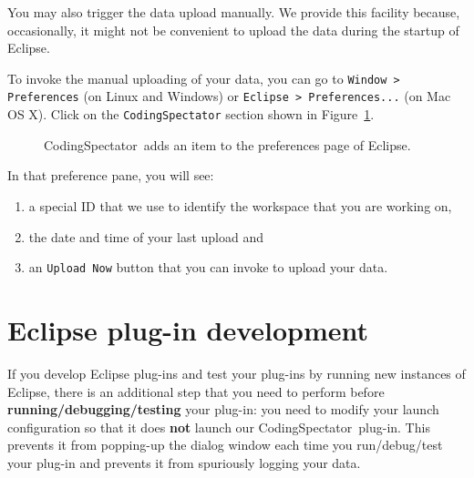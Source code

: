 \documentclass{article}
\newcommand{\fig}[1]{\imgsrc{#1.png}}
\newcommand\fig[1]{\texttt{[image: \#1]}}%
\newcommand\codspec{CodingSpectator}
\newcommand\uiref[1]{\texttt{#1}}
\begin{document}
You may also trigger the data upload manually. We provide this facility because,
occasionally, it might not be convenient to upload the data during the startup
of Eclipse.

To invoke the manual uploading of your data, you can go to \uiref{Window >
Preferences} (on Linux and Windows) or \uiref{Eclipse > Preferences...} (on Mac
OS X). Click on the \uiref{\codspec} section shown in
Figure~\ref{FigPreferences}.

\begin{figure}[h]
%
\centering
%
\fig{figs/preferences}
%
\caption{\label{FigPreferences}\codspec\ adds an item to the preferences page of
Eclipse.}
%
\end{figure}

In that preference pane, you will see:

\begin{enumerate}
%
\item a special ID that we use to identify the workspace that you are working
on,
%
\item the date and time of your last upload and
%
\item an \uiref{Upload Now} button that you can invoke to upload your data.
%
\end{enumerate}

\section{Eclipse plug-in development}

If you develop Eclipse plug-ins and test your plug-ins by running new instances
of Eclipse, there is an additional step that you need to perform before
\textbf{running/debugging/testing} your plug-in: you need to modify your launch
configuration so that it does \textbf{not} launch our \codspec\ plug-in. This
prevents it from popping-up the dialog window each time you run/debug/test your
plug-in and prevents it from spuriously logging your data.
\end{document}
